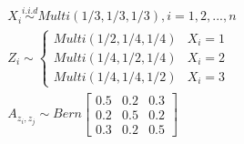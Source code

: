 \documentclass[12pt]{article}
\theoremstyle{definition}
\begin{document}
\begin{equation}
\label{eq:Three}
\begin{gathered}
X_{i} \overset{i.i.d}{\sim} Multi(1/3, 1/3, 1/3), i = 1,2, ... , n \\ 
Z_{i}  \sim  \left\{  \begin{array}{ccc} Multi(1/2, 1/4, 1/4) & X_{i} = 1 \\ Multi(1/4, 1/2, 1/4) & X_{i} = 2 \\ Multi(1/4, 1/4, 1/2) & X_{i} = 3  \end{array} \right. \\
A_{z_{i}, z_{j}} \sim Bern \left[  \begin{array}{ccc}   0.5 & 0.2 &  0.3  \\ 0.2 & 0.5 & 0. 2  \\ 0.3 & 0.2 & 0.5  \end{array}  \right]
\end{gathered}
\end{equation}
\end{document}
